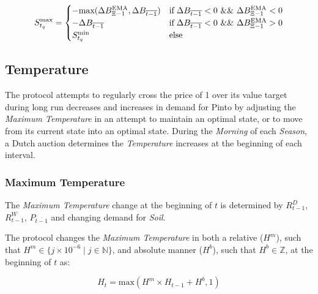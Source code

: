 \documentclass[tikz]{article}
\newcommand{\term}[1]{\textsl{#1}}
\newcommand{\Pinto}{} %
\begin{document}
    $$
        S_{t_{q}}^{\text{max}} = 
            \begin{cases} 
                -\text{max}(\Delta B_{\Xi-1}^{\text{EMA}}, \Delta B_{\overline{t-1}}) 
                    & \text{if} \; 
                        \Delta B_{\overline{t-1}} < 0 \mkern6mu \&\& \mkern6mu \Delta B_{\Xi-1}^{\text{EMA}} < 0 \\

                -\Delta B_{\overline{t-1}}
                    & \text{if} \; 
                        \Delta B_{\overline{t-1}} < 0 \mkern6mu \&\& \mkern6mu \Delta B_{\Xi-1}^{\text{EMA}} > 0 \\
                
                S_{t_{q}}^{\text{min}}
                    & \text{else} 
            \end{cases} 
    $$


\subsection{Temperature}

The protocol attempts to regularly cross the price of \Pinto1 over its value target during long run decreases and increases in demand for Pinto by adjusting the \term{Maximum Temperature} in an attempt to maintain an optimal state, or to move from its current state into an optimal state. During the \term{Morning} of each \term{Season}, a Dutch auction determines the \term{Temperature} increases at the beginning of each interval. 


\subsubsection{Maximum Temperature}

The \term{Maximum Temperature} change at the beginning of $t$ is determined by $R_{t-1}^{D}$, $R_{t-1}^{W}$, $P_{\overline{t-1}}$ and changing demand for \term{Soil}.

The protocol changes the \term{Maximum Temperature} in both a relative ($H^{m}$), such that $H^{m} \in \{j \times 10^{-6} \mid j \in \mathbb{N} \}$, and absolute manner ($H^{b}$), such that $H^{b} \in \mathbb{Z}$, at the beginning of $t$ as:

    $$
        H_{t} = \text{max}(
                    H^{m} \times H_{t-1} + H^{b}, 
                    1)
    $$
\end{document}
